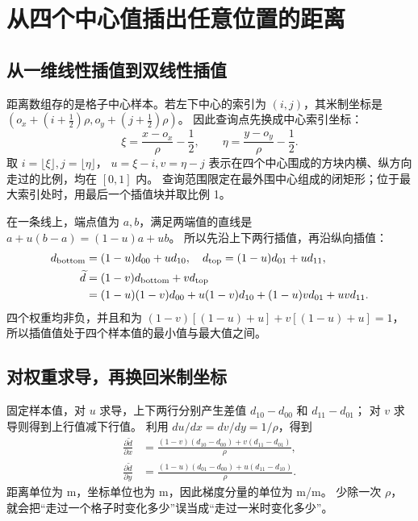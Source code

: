 \section{从四个中心值插出任意位置的距离}
\subsection{从一维线性插值到双线性插值}
距离数组存的是格子中心样本。若左下中心的索引为 $(i,j)$，其米制坐标是
$(o_x+(i+\tfrac12)\rho,o_y+(j+\tfrac12)\rho)$。
因此查询点先换成中心索引坐标：
\begin{equation}
\xi=\frac{x-o_x}{\rho}-\frac12,\qquad\eta=\frac{y-o_y}{\rho}-\frac12.
\end{equation}
取 $i=\lfloor\xi\rfloor,j=\lfloor\eta\rfloor$，
$u=\xi-i,v=\eta-j$ 表示在四个中心围成的方块内横、纵方向走过的比例，均在 $[0,1]$ 内。
查询范围限定在最外围中心组成的闭矩形；位于最大索引处时，用最后一个插值块并取比例 1。

\begin{center}
\end{center}
在一条线上，端点值为 $a,b$，满足两端值的直线是 $a+u(b-a)=(1-u)a+ub$。
所以先沿上下两行插值，再沿纵向插值：
\begin{align}
d_{\rm bottom}&=(1-u)d_{00}+ud_{10},\quad
 d_{\rm top}=(1-u)d_{01}+ud_{11},\\
\widetilde d&=(1-v)d_{\rm bottom}+v d_{\rm top}\\
&=(1-u)(1-v)d_{00}+u(1-v)d_{10}+(1-u)vd_{01}+uvd_{11}.
\end{align}
四个权重均非负，并且和为
$(1-v)[(1-u)+u]+v[(1-u)+u]=1$，所以插值值处于四个样本值的最小值与最大值之间。

\subsection{对权重求导，再换回米制坐标}
固定样本值，对 $u$ 求导，上下两行分别产生差值 $d_{10}-d_{00}$ 和 $d_{11}-d_{01}$；
对 $v$ 求导则得到上行值减下行值。
利用 $du/dx=dv/dy=1/\rho$，得到
\begin{align}
\frac{\partial\widetilde d}{\partial x}
&=\frac{(1-v)(d_{10}-d_{00})+v(d_{11}-d_{01})}{\rho},\\
\frac{\partial\widetilde d}{\partial y}
&=\frac{(1-u)(d_{01}-d_{00})+u(d_{11}-d_{10})}{\rho}.
\end{align}
距离单位为 m，坐标单位也为 m，因此梯度分量的单位为 m/m。
少除一次 $\rho$，就会把“走过一个格子时变化多少”误当成“走过一米时变化多少”。

